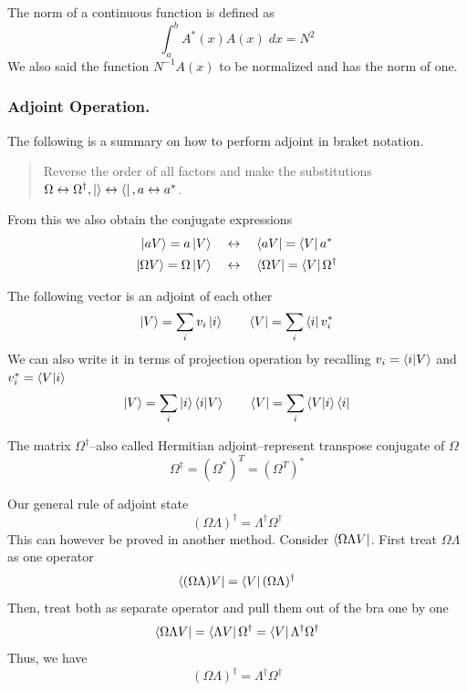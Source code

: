 \documentclass[../../../main.tex]{subfiles}
\begin{document}
The norm of a continuous function is defined as
\begin{equation*}
	\int_{a}^{b}A^*(x)A(x)\;dx=N^2
\end{equation*}
We also said the function $N^{-1}A(x)$ to be normalized and has the norm of one.

\subsubsection{Adjoint Operation.}
The following is a summary on how to perform adjoint in braket notation.
\begin{quotation}
	Reverse the order of all factors and make the substitutions $\Omega\leftrightarrow\Omega^\dagger,\ket{}\leftrightarrow \bra{}, a\leftrightarrow a^*$.
\end{quotation}
From this we also obtain the conjugate expressions
\begin{align*}
	\ket{aV}=a \ket{V}\quad            & \leftrightarrow \quad\bra{aV}=\bra{V}a^*                 \\
	\ket{\Omega V}=\Omega \ket{V}\quad & \leftrightarrow\quad\bra{\Omega V}=\bra{V}\Omega^\dagger
\end{align*}

The following vector is an adjoint of each other
\begin{equation*}
	\ket{V}=\sum_iv_i \ket{i}\qquad \bra{V}=\sum_i \bra{i}v_i^*
\end{equation*}
We can also write it in terms of projection operation by recalling $v_i=\braket{i|V}$ and $v_i^*=\braket{V|i}$
\begin{equation*}
	\ket{V}=\sum_i \ket{i} \braket{i|V}\qquad \bra{V}=\sum_i \braket{V|i}\bra{i}
\end{equation*}

The matrix $\Omega^\dagger$--also called Hermitian adjoint--represent transpose conjugate of $\Omega$
\begin{equation*}
	\Omega^{\dagger}=(\Omega^*)^T=(\Omega^T)^*
\end{equation*}

Our general rule of adjoint state
\begin{equation*}
	(\Omega\Lambda)^\dagger=\Lambda ^\dagger \Omega ^\dagger
\end{equation*}
This can however be proved in another method.
Consider $\bra{\Omega \Lambda V}$. First treat $\Omega\Lambda$ as one operator
\begin{equation*}
	\bra{(\Omega\Lambda)V}=\bra{V}(\Omega\Lambda) ^\dagger
\end{equation*}
Then, treat both as separate operator and pull them out of the bra one by one
\begin{equation*}
	\bra{\Omega\Lambda V}=\bra{\Lambda V}\Omega^\dagger=\bra{V}\Lambda ^\dagger \Omega ^\dagger
\end{equation*}
Thus, we have
\begin{equation*}
	(\Omega\Lambda) ^\dagger=\Lambda ^\dagger\Omega ^\dagger
\end{equation*}
\end{document}
